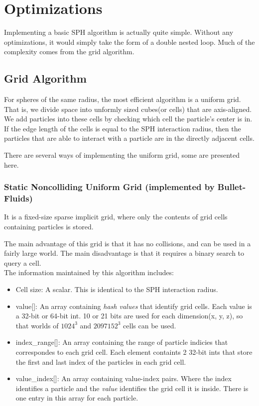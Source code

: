 \documentclass[]{article}
\begin{document}
\pagebreak		
\section{Optimizations}
	Implementing a basic SPH algorithm is actually quite simple. Without any optimizations, 
	it would simply take the form of a double nested loop. Much of the complexity comes from the grid algorithm.
		
	\subsection{Grid Algorithm}
		For spheres of the same radius, the most efficient algorithm is a uniform grid.
		That is, we divide space into unformly sized cubes(or cells) that are axis-aligned. 
		We add particles into these cells by checking which cell the particle's center is in. 
		If the edge length of the cells is equal to the SPH interaction radius, then the particles
		that are able to interact with a particle are in the directly adjacent cells.
		
		There are several ways of implementing the uniform grid, some are presented here.\\
		
		\subsubsection{Static Noncolliding Uniform Grid (implemented by Bullet-Fluids) }
			It is a fixed-size sparse implicit grid, where only the contents of grid cells containing particles is stored.
			
			The main advantage of this grid is that it has no collisions, and can be used in a fairly large world. 
			The main disadvantage is that it requires a binary search to query a cell.\\
			
			The information maintained by this algorithm includes:
			\begin{itemize}
				\item Cell size: A scalar. This is identical to the SPH interaction radius.
				\item value[]: An array containing \textit{hash values} that identify grid cells. Each value is a 32-bit or 
				64-bit int. 10 or 21 bits are used for each dimension(x, y, z), so that worlds of \(1024^3\) and 
				\(2097152^3\) cells can be used.
				\item index\_range[]: An array containing the range of particle indicies that correspondes to each grid
				cell. Each element containts 2 32-bit ints that store the first and last index of the particles in each
				grid cell.
				\item value\_index[]: An array containing value-index pairs. Where the index identifies a particle and the
				\textit{value} identifies the grid cell it is inside. There is one entry in this array for each particle.
			\end{itemize}
			
\end{document}
